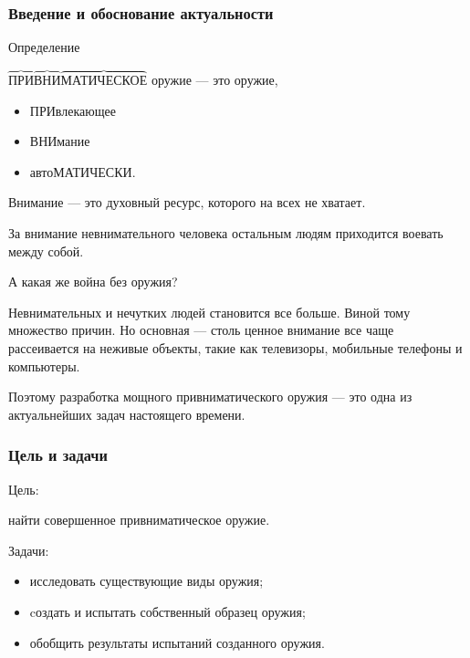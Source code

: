 \begin{frame}
    \frametitle{Введение и обоснование актуальности}
    
    \begin{block}{Определение}
        \par\bigskip
        \alert{$\overbrace{\text{ПРИ}}\overbrace{\text{ВНИ}}\overbrace{\text{МАТИЧЕСКОЕ}}$} оружие --- это оружие, 
        \begin{itemize}
            \item \alert{ПРИ}влекающее 
            \item \alert{ВНИ}мание 
            \item авто\alert{МАТИЧЕСКИ}.
        \end{itemize}
    \end{block}
    
    
    \alert{Внимание} --- это духовный ресурс, которого на всех не хватает. 

    \par\bigskip

    За внимание невнимательного человека остальным людям приходится воевать между собой. 

    \par\bigskip

    А какая же война без \alert{оружия}?
\end{frame}
    
Невнимательных и нечутких людей становится все больше. Виной тому множество причин. Но основная --- столь ценное внимание все чаще рассеивается на неживые объекты, такие как телевизоры, мобильные телефоны и компьютеры.
    
Поэтому разработка мощного привниматического оружия --- это одна из актуальнейших задач настоящего времени.

\begin{frame}
    \frametitle{Цель и задачи}
    
    \begin{block}{Цель:}
        \begin{center}
            найти \alert{совершенное} привниматическое оружие.
        \end{center}
    \end{block}
    
    \par\bigskip
    
    \begin{block}{Задачи:}
        \begin{itemize}
            \item исследовать существующие виды оружия; 
            \item cоздать и испытать собственный образец оружия;
            \item обобщить результаты испытаний созданного оружия.
        \end{itemize}
    \end{block}
\end{frame}


